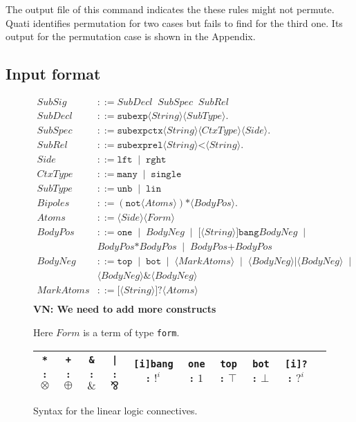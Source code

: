 \documentclass{llncs}
\newcommand{\tup}[1]{\langle#1\rangle}
\begin{document}
The output file of this command indicates the these rules might not permute.
Quati identifies permutation for two cases but fails to find for the third one.
Its output for the permutation case is shown in the Appendix.
%

\subsection{Input format}

\begin{figure}[t]
{\small
\begin{align*}
SubSig &::= SubDecl \;\; SubSpec \;\; SubRel \\
SubDecl &::= \texttt{subexp} \tup{String} \tup{SubType}.\\
SubSpec &::= \texttt{subexpctx} \tup{String} \tup{CtxType} \tup{Side}.\\
SubRel &::= \texttt{subexprel} \tup{String} \texttt{<} \tup{String}. \\
Side &::= \texttt{lft} \;\;|\;\; \texttt{rght} \\
CtxType &::=  \texttt{many} \;\;|\;\; \texttt{single} \\
SubType &::=  \texttt{unb} \;\;|\;\; \texttt{lin} \\
Bipoles &::= (\texttt{not} \tup{Atoms}) \texttt{*} \tup{BodyPos}. \\
Atoms &::= \tup{Side} \tup{Form} \\
BodyPos &::= \texttt{one} \;\;|\;\; BodyNeg \;\;|\;\; \texttt{[}\tup{String}\texttt{]bang} BodyNeg \;\;|\;\;\\ 
        & BodyPos \texttt{*} BodyPos \;\;|\;\; BodyPos \texttt{+} BodyPos \\
BodyNeg &::= \texttt{top} \;\;|\;\; \texttt{bot} \;\;|\;\; \tup{MarkAtoms} \;\;|\;\; \tup{BodyNeg}|\tup{BodyNeg} \;\;|\;\; \\
        & \tup{BodyNeg} \texttt{\&} \tup{BodyNeg}\\
MarkAtoms &::= \texttt{[}\tup{String}\texttt{]?} \tup{Atoms} \\
\end{align*}
}
\textbf{VN: We need to add more constructs}
\caption{Here $Form$ is a term of type \texttt{form}.} 
\label{fig:syntax}
\begin{center}
\begin{tabular}{c@{\quad}c@{\quad}c@{\quad}c@{\quad}c@{\quad}c@{\quad}c@{\quad}c@{\quad}c@{\quad}c}
\toprule
\texttt{*} : $\otimes$ & \texttt{+} : $\oplus$ & \texttt{\&} : $\&$ & \texttt{|} : $\bindnasrepma$ & \texttt{[i]bang} : $!^i$ &
\texttt{one} : $1$ &  \texttt{top} : $\top$ & \texttt{bot} : $\bot$ & \texttt{[i]?} : $?^i$ \\
\bottomrule
\end{tabular}
\end{center}
\caption{Syntax for the linear logic connectives.}
\label{fig:syntax_ll}
\end{figure}
\end{document}
